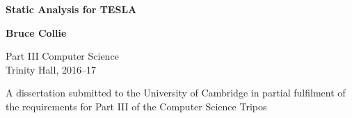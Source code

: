\begin{titlepage}
  \begin{center}
  
  \vspace*{1cm}
  \Huge\textbf{Static Analysis for TESLA}

  \LARGE
  \vspace{1.5cm}
  \textbf{Bruce Collie}

  \vspace{0.5cm}


  \large
  Part III Computer Science \\
  Trinity Hall, 2016--17

  \vfill

  \vspace{1.5cm}

  \normalsize
  A dissertation submitted to the University of Cambridge in partial fulfilment
    of the requirements for Part III of the Computer Science Tripos

  \end{center}
\end{titlepage}

